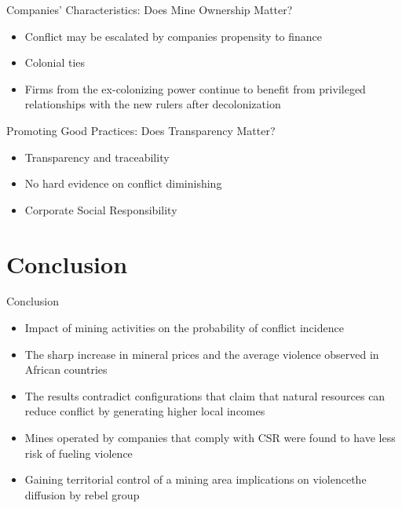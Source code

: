 \documentclass[pdftex,12pt,xcolor=pdftex,table]{beamer}
\theoremstyle{definition}
\theoremstyle{remark}
\numberwithin{equation}{section}
\numberwithin{figure}{section}
\begin{document}
		\begin{frame}{Companies' Characteristics: Does Mine Ownership Matter?}
			\justifying
			\begin{itemize}
            \item Conflict may be escalated by companies propensity to finance
            \item Colonial ties
            \item Firms from the ex-colonizing power continue to benefit from privileged relationships with the new rulers after decolonization
            
            \end{itemize}
            
	        \end{frame}
	        
	        
		\begin{frame}{Promoting Good Practices: Does Transparency Matter?}
			\justifying
			\begin{itemize}
            \item Transparency and traceability
            \item No hard evidence on conflict diminishing
            \item Corporate Social Responsibility
            
            \end{itemize}
            
	        \end{frame}
	   
	
	  \section{Conclusion}
    \begin{frame}{Conclusion}
        \justifying
        \begin{itemize}
        \item Impact of mining activities on the probability of conflict incidence
        \item The sharp increase in mineral prices and the average violence observed in African countries
        \item The results contradict configurations that claim that natural resources can reduce conflict by generating higher local incomes
        \item Mines operated by companies that comply with CSR were found to have less risk of fueling violence
        \item Gaining territorial control of a mining area implications on violencethe diffusion by rebel group
    
        \end{itemize}
        
    
         \end{frame}
         
\end{document}
